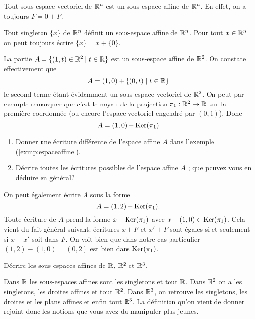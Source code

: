 \documentclass[11pt, a4paper]{article}
\begin{document}
\begin{exmp}
  Tout sous-espace vectoriel de $\mathbb{R}^n$ est un sous-espace affine de
  $\mathbb{R}^n$. En effet, on a toujours $F = 0 + F$.
\end{exmp}
\begin{exmp}
  Tout singleton $\{x\}$ de $\mathbb{R}^n$ définit un sous-espace affine de
  $\mathbb{R}^n$. Pour tout $x \in \mathbb{R}^n$ on peut toujours écrire
  $\{x\} = x + \{0\}$.
\end{exmp}
\begin{exmp}
  \label{exmp:espaceaffine}
  La partie $A = \{(1,t) \in \mathbb{R}^2 \mid t \in \mathbb{R}\}$ est un sous-espace
  affine de $\mathbb{R}^2$. On constate effectivement que
  \[
    A = (1, 0) + \{(0, t) \mid t \in \mathbb{R}\}
  \]
  le second terme étant évidemment un sous-espace vectoriel de
  $\mathbb{R}^2$. On peut par exemple remarquer que c'est le noyau de la
  projection $\pi_1 : \mathbb{R}^2 \rightarrow \mathbb{R}$ sur la première coordonnée
  (ou encore l'espace vectoriel engendré par $(0, 1)$). Donc
  \[
    A = (1, 0) + \operatorname{Ker}(\pi_1)
  \]
\end{exmp}
\begin{question}
  \label{q:affinesecritures}
  \begin{enumerate}
  \item Donner une écriture différente de l'espace affine $A$ dans l'exemple
    (\ref{exmp:espaceaffine}).
  \item Décrire toutes les écritures possibles de l'espace affine $A$ ;
    que pouvez vous en déduire en général?
  \end{enumerate}
\end{question}
\begin{solution}
  On peut également écrire $A$ sous la forme
  \[
    A = (1, 2) + \operatorname{Ker}(\pi_1).
  \]
  Toute écriture de $A$ prend la forme $x + \operatorname{Ker}(\pi_1)$ avec
  $x - (1, 0) \in \operatorname{Ker}(\pi_1)$. Cela vient du fait général suivant:
  écritures $x + F$ et $x'+ F$ sont égales si et seulement si $x - x'$
  soit dans $F$. On voit bien que dans notre cas particulier
  $(1, 2) - (1, 0) = (0, 2)$ est bien dans $\operatorname{Ker}(\pi_1)$.
\end{solution}
\begin{question}
  Décrire les sous-espaces affines de $\mathbb{R}$, $\mathbb{R}^2$ et $\mathbb{R}^3$.
\end{question}
\begin{solution}
  Dans $\mathbb{R}$ les sous-espaces affines sont les singletons et tout
  $\mathbb{R}$. Dans $\mathbb{R}^2$ on a les singletons, les droites
  affines et tout $\mathbb{R}^2$. Dans $\mathbb{R}^3$, on retrouve les
  singletons, les droites et les plans affines et enfin tout
  $\mathbb{R}^3$. La définition qu'on vient de donner rejoint donc les
  notions que vous avez du manipuler plus jeunes.
\end{solution}
\end{document}
